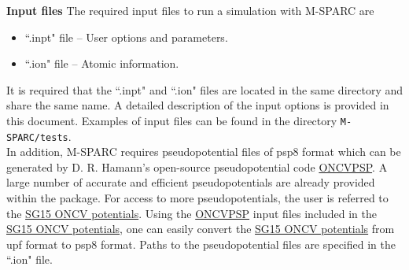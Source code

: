 \documentclass[xcolor=dvipsnames,t]{beamer}
\begin{document}
\begin{frame}[allowframebreaks]{\textbf{Input files}} \label{Inputfiles}
The required input files to run a simulation with M-SPARC are
\begin{itemize}
  \item ``.inpt" file -- User options and parameters.
  \item ``.ion" file -- Atomic information.
\end{itemize}
It is required that the ``.inpt" and ``.ion" files are located in the same directory and share the same name. A detailed description of the input options is provided in this document. Examples of input files can be found in the directory \texttt{M-SPARC/tests}. \\
In addition, M-SPARC requires pseudopotential files of psp8 format which can be generated by D. R. Hamann's open-source pseudopotential code \href{http://www.mat-simresearch.com/}{ONCVPSP}. A large number of accurate and efficient pseudopotentials are already provided within the package. For access to more pseudopotentials, the user is referred to the \href{http://www.quantum-simulation.org/potentials/sg15_oncv/}{SG15 ONCV potentials}. Using the \href{http://www.mat-simresearch.com/}{ONCVPSP} input files included in the \href{http://www.quantum-simulation.org/potentials/sg15_oncv/}{SG15 ONCV potentials}, one can easily convert the \href{http://www.quantum-simulation.org/potentials/sg15_oncv/}{SG15 ONCV potentials} from upf format to psp8 format. Paths to the pseudopotential files are specified in the ``.ion" file.
\end{frame}
\end{document}
